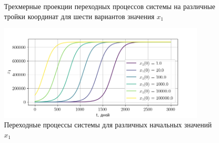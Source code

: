 \documentclass[14pt,a4paper]{extarticle}
\begin{document}
\begin{example}
		\begin{figure}[h]
			\centering
			\caption{Трехмерные проекции переходных процессов системы на различные тройки координат для шести вариантов значения $x_1$}
			\label{fig:in_D_3d}
		\end{figure}
		\begin{figure}[h]
			\centering
			\includegraphics[width=0.90\textwidth]{media/Figure_11.png}
			\caption{Переходные процессы системы для различных начальных значений~$x_1$}
			\label{fig:x1_transitions}
		\end{figure}
		

\end{example}
\end{document}
